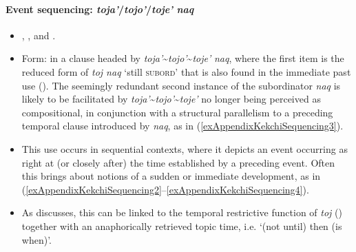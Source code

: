 \paragraph{Event sequencing: \textit{toja'}/\textit{tojo'}/\textit{toje'} \textit{naq}}
\label{appendixKekchiSequencing}
\begin{itemize}
	\item \textcite[171]{VocabularioKechi2004}, \textcite[202]{EachusCarlson1980}, \textcite{Kockelman2020} and \textcite[360]{SamJuarezEtAl2003}.	
	\item Form: in a clause headed by \textit{toja'}\sim\textit{tojo'}\sim\textit{toje'} \textit{naq}, where the first item is the reduced form of \textit{toj naq} \lq still \textsc{subord}\rq{ }that is also found in the immediate past use  (). The seemingly redundant second instance of the subordinator \textit{naq} is likely to be facilitated by \textit{toja'}\sim\textit{tojo'}\sim\textit{toje'} no longer being perceived as compositional, in conjunction with a structural parallelism to a preceding temporal clause introduced by \textit{naq}, as in (\ref{exAppendixKekchiSequencing3}). 
	\item This use occurs in sequential contexts, where it depicts an event occurring as right at (or closely after) the time established by a preceding event. Often this brings about notions of a sudden or immediate development, as in (\ref{exAppendixKekchiSequencing2}–\ref{exAppendixKekchiSequencing4}).
	\item As \textcite{Kockelman2020} discusses, this can be linked to the temporal restrictive function of \textit{toj} () together with an anaphorically retrieved topic time, i.e. \lq (not until) then (is when)'.
\end{itemize}
